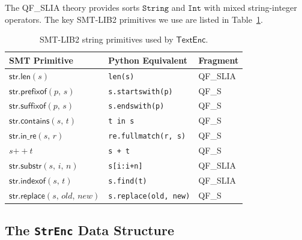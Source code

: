 \documentclass[11pt]{article}
\newcommand{\TextEnc}{\ensuremath{\mathsf{TextEnc}}}
\newcommand{\QFSLIA}{\textsf{QF\_SLIA}}
\newcommand{\QFS}{\textsf{QF\_S}}
\newcommand{\strsort}{\ensuremath{\mathtt{String}}}
\newcommand{\strlen}[1]{\ensuremath{\mathsf{str.len}(#1)}}
\newcommand{\strpre}[2]{\ensuremath{\mathsf{str.prefixof}(#1,\,#2)}}
\newcommand{\strsuf}[2]{\ensuremath{\mathsf{str.suffixof}(#1,\,#2)}}
\newcommand{\strinre}[2]{\ensuremath{\mathsf{str.in\_re}(#1,\,#2)}}
\newcommand{\strconcat}[2]{\ensuremath{#1 \mathbin{+\!\!+} #2}}
\newcommand{\strcont}[2]{\ensuremath{\mathsf{str.contains}(#1,\,#2)}}
\newcommand{\strreplace}[3]{\ensuremath{\mathsf{str.replace}(#1,\,#2,\,#3)}}
\newcommand{\strindexof}[2]{\ensuremath{\mathsf{str.indexof}(#1,\,#2)}}
\newcommand{\strsubstr}[3]{\ensuremath{\mathsf{str.substr}(#1,\,#2,\,#3)}}
\begin{document}
The \QFSLIA{} theory provides sorts $\strsort$ and $\mathtt{Int}$ with mixed
string-integer operators.  The key SMT-LIB2 primitives we use are listed in
Table~\ref{tab:smtprims}.

\begin{table}[h]
\centering
\caption{SMT-LIB2 string primitives used by \TextEnc.}
\label{tab:smtprims}
\begin{tabular}{lll}
\hline
\textbf{SMT Primitive} & \textbf{Python Equivalent} & \textbf{Fragment} \\
\hline
$\strlen{s}$                   & \texttt{len(s)}              & \QFSLIA \\
$\strpre{p}{s}$                & \texttt{s.startswith(p)}     & \QFS \\
$\strsuf{p}{s}$                & \texttt{s.endswith(p)}       & \QFS \\
$\strcont{s}{t}$               & \texttt{t in s}              & \QFS \\
$\strinre{s}{r}$               & \texttt{re.fullmatch(r, s)}  & \QFS \\
$\strconcat{s}{t}$             & \texttt{s + t}               & \QFS \\
$\strsubstr{s}{i}{n}$          & \texttt{s[i:i+n]}            & \QFSLIA \\
$\strindexof{s}{t}$            & \texttt{s.find(t)}           & \QFSLIA \\
$\strreplace{s}{\mathit{old}}{\mathit{new}}$ & \texttt{s.replace(old, new)} & \QFS \\
\hline
\end{tabular}
\end{table}

\subsection{The \texttt{StrEnc} Data Structure}
\label{sec:strenc}
\end{document}
